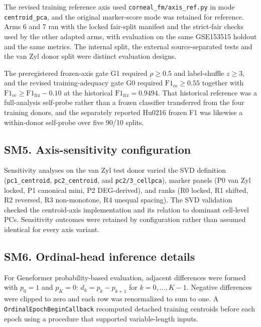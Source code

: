 \documentclass[12pt,a4paper]{article}
\begin{document}
The revised training reference axis used \texttt{corneal\_fm/axis\_ref.py} in mode \texttt{centroid\_pca}, and the original marker-score mode was retained for reference. Arms 6 and 7 ran with the locked fair-split manifest and the strict-fair checks used by the other adapted arms, with evaluation on the same GSE153515 holdout and the same metrics. The internal split, the external source-separated tests and the van Zyl donor split were distinct evaluation designs.

The preregistered frozen-axis gate G1 required $\rho\ge0.5$ and label-shuffle $z\ge3$, and the revised training-adequacy gate G0 required $\mathrm{F1}_{\mathrm{ce}}\ge0.55$ together with $\mathrm{F1}_{\mathrm{ce}}\ge\mathrm{F1}_{\mathrm{frz}}-0.10$ at the historical $\mathrm{F1}_{\mathrm{frz}}=0.9494$. That historical reference was a full-analysis self-probe rather than a frozen classifier transferred from the four training donors, and the separately reported Hu0216 frozen F1 was likewise a within-donor self-probe over five 90/10 splits.

\subsection*{SM5. Axis-sensitivity configuration}
Sensitivity analyses on the van Zyl test donor varied the SVD definition (\texttt{pc1\_centroid}, \texttt{pc2\_centroid}, and \texttt{pc2/3\_cellpca}), marker panels (P0 van Zyl locked, P1 canonical mini, P2 DEG-derived), and ranks (R0 locked, R1 shifted, R2 reversed, R3 non-monotone, R4 unequal spacing). The SVD validation checked the centroid-axis implementation and its relation to dominant cell-level PCs. Sensitivity outcomes were retained by configuration rather than assumed identical for every axis variant.

\subsection*{SM6. Ordinal-head inference details}
For Geneformer probability-based evaluation, adjacent differences were formed with $p_0=1$ and $p_K=0$: $d_k=p_k-p_{k+1}$ for $k=0,\ldots,K-1$. Negative differences were clipped to zero and each row was renormalized to sum to one. A \texttt{OrdinalEpochBeginCallback} recomputed detached training centroids before each epoch using a procedure that supported variable-length inputs.
\end{document}
